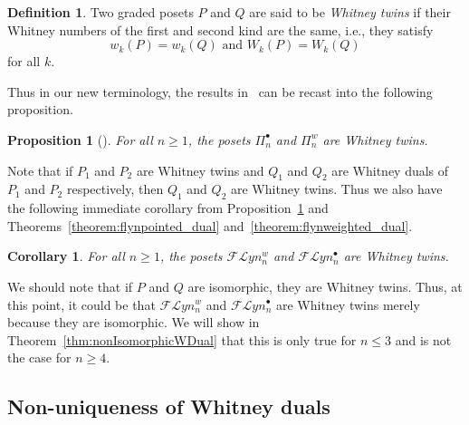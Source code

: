 \documentclass[11pt]{article}
\newtheorem{prop}[theo]{Proposition}
\newtheorem{coro}[theo]{Corollary}
\theoremstyle{definition}
\newtheorem{defi}[theo]{Definition}
\numberwithin{equation}{section}
\newcommand{\Flyn}{\mathcal{FL}yn}
\begin{document}
\begin{defi}\label{definition:whitney_twins}
Two graded posets $P$ and $Q$  are said to be \emph{Whitney twins} if their Whitney numbers of the first and second kind are the same, i.e., they satisfy
$$w_k(P)=w_k(Q)\text{ and } W_k(P)=W_k(Q)$$
for all $k$.
\end{defi}

Thus in our new terminology, the results in~\cite{GonzalezDleonWachs2016} can be recast into the following proposition.

\begin{prop} [{\cite[Section 2.4]{GonzalezDleonWachs2016}}] \label{proposition:whitney_twins_weighted_pointed} For all $n\ge 1$, the posets
$ \Pi_n^{\bullet}$ and $ \Pi_{n}^{w}$ are Whitney twins. 
 \end{prop}
 
Note that if $P_1$ and $P_2$ are Whitney twins and $Q_1$ and $Q_2$ are Whitney duals of $P_1$ and $P_2$ respectively, then $Q_1$ and $Q_2$ are Whitney twins.  Thus we also have the following immediate corollary from Proposition~\ref{proposition:whitney_twins_weighted_pointed} and Theorems~\ref{theorem:flynpointed_dual} and~\ref{theorem:flynweighted_dual}.

\begin{coro}\label{cor:pointedLynAndBicoloredAreWhitneyTwins}
For all $n\geq 1$, the posets $\Flyn_{n}^{w}$ and $\Flyn_{n}^{\bullet}$ are Whitney twins.
\end{coro}
We should note that if $P$ and $Q$ are isomorphic, they are  Whitney twins.  Thus, at this point, it could be that   $\Flyn_{n}^{w}$ and $\Flyn_{n}^{\bullet}$ are Whitney twins merely because they are isomorphic. We will show in Theorem~\ref{thm:nonIsomorphicWDual} that this is only true for $n\le 3$ and is not the case for $n\ge 4$.

\subsection{Non-uniqueness of Whitney duals}
  
\end{document}
